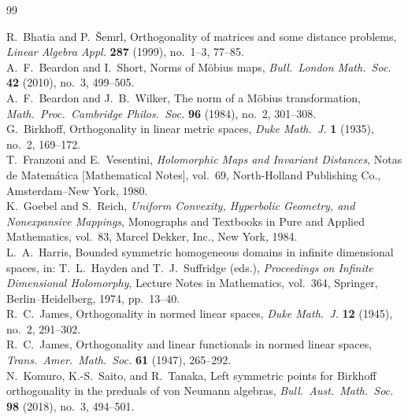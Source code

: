 \documentclass[12pt]{amsart}
\theoremstyle{definition}
\begin{document}
\begin{thebibliography}{99}


R.~Bhatia and P.~\v{S}emrl,
Orthogonality of matrices and some distance problems,
\emph{Linear Algebra Appl.} \textbf{287} (1999), no.~1--3, 77--85.\\

A.~F.~Beardon and I.~Short,
Norms of M\"{o}bius maps,
\emph{Bull.\ London Math.\ Soc.} \textbf{42} (2010), no.~3, 499--505.\\

A.~F.~Beardon and J.~B.~Wilker,
The norm of a M\"{o}bius transformation,
\emph{Math.\ Proc.\ Cambridge Philos.\ Soc.} \textbf{96} (1984), no.~2, 301--308.\\

G.~Birkhoff,
Orthogonality in linear metric spaces,
\emph{Duke Math.\ J.} \textbf{1} (1935), no.~2, 169--172.\\

T.~Franzoni and E.~Vesentini,
\emph{Holomorphic Maps and Invariant Distances},
Notas de Matem\'{a}tica [Mathematical Notes], vol.~69,
North-Holland Publishing Co., Amsterdam--New York, 1980.\\

K.~Goebel and S.~Reich,
\emph{Uniform Convexity, Hyperbolic Geometry, and Nonexpansive Mappings},
Monographs and Textbooks in Pure and Applied Mathematics, vol.~83,
Marcel Dekker, Inc., New York, 1984.\\


L.~A.~Harris,
Bounded symmetric homogeneous domains in infinite dimensional spaces,
in: T.~L.~Hayden and T.~J.~Suffridge (eds.),
\emph{Proceedings on Infinite Dimensional Holomorphy},
Lecture Notes in Mathematics, vol.~364,
Springer, Berlin--Heidelberg, 1974, pp.~13--40.\\

R.~C.~James,
Orthogonality in normed linear spaces,
\emph{Duke Math.\ J.} \textbf{12} (1945), no.~2, 291--302.\\

R.~C.~James,
Orthogonality and linear functionals in normed linear spaces,
\emph{Trans.\ Amer.\ Math.\ Soc.} \textbf{61} (1947), 265--292.\\

N.~Komuro, K.-S.~Saito, and R.~Tanaka,
Left symmetric points for Birkhoff orthogonality in the preduals of von Neumann algebras,
\emph{Bull.\ Aust.\ Math.\ Soc.} \textbf{98} (2018), no.~3, 494--501.\\


\end{thebibliography}
\end{document}
